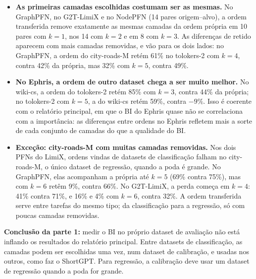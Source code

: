 \documentclass[12pt,a4paper]{article}
\begin{document}
\begin{itemize}
  \item \textbf{As primeiras camadas escolhidas costumam ser as mesmas.} No GraphPFN, no G2T-LimiX e no NodePFN (14 pares origem--alvo), a ordem transferida remove exatamente as mesmas camadas da ordem própria em 10 pares com $k=1$, nos 14 com $k=2$ e em 8 com $k=3$. As diferenças de retido aparecem com mais camadas removidas, e vão para os dois lados: no GraphPFN, a ordem do city-roads-M retém 61\% no tolokers-2 com $k=4$, contra 42\% da própria, mas 32\% com $k=5$, contra 49\%.
  \item \textbf{No Ephris, a ordem de outro dataset chega a ser muito melhor.} No wiki-cs, a ordem do tolokers-2 retém 85\% com $k=3$, contra 44\% da própria; no tolokers-2 com $k=5$, a do wiki-cs retém 59\%, contra $-9\%$. Isso é coerente com o relatório principal, em que o BI do Ephris quase não se correlaciona com a importância: as diferenças entre ordens no Ephris refletem mais a sorte de cada conjunto de camadas do que a qualidade do BI.
  \item \textbf{Exceção: city-roads-M com muitas camadas removidas.} Nos dois PFNs do LimiX, ordens vindas de datasets de classificação falham no city-roads-M, o único dataset de regressão, quando a poda é grande. No GraphPFN, elas acompanham a própria até $k=5$ (69\% contra 75\%), mas com $k=6$ retêm 9\%, contra 66\%. No G2T-LimiX, a perda começa em $k=4$: 41\% contra 71\%, e 16\% e 4\% com $k=6$, contra 32\%. A ordem transferida serve entre tarefas do mesmo tipo; da classificação para a regressão, só com poucas camadas removidas.
\end{itemize}

\noindent\textbf{Conclusão da parte 1:} medir o BI no próprio dataset de avaliação não está inflando os resultados do relatório principal. Entre datasets de classificação, as camadas podem ser escolhidas uma vez, num dataset de calibração, e usadas nos outros, como faz o ShortGPT. Para regressão, a calibração deve usar um dataset de regressão quando a poda for grande.

\begin{table}[H]
\centering
\caption{Retido no teste do alvo (\%) por número de camadas removidas $k$, para a ordem de BI do próprio alvo, a ordem de BI de cada outro dataset (``de \ldots'') e a ordem aleatória (mediana de 3). Média de 3 sementes.}
\label{tab:parte1}
\end{table}
\end{document}
